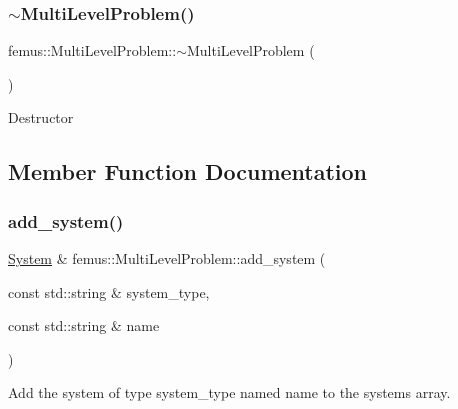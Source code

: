 \subsubsection{\texorpdfstring{$\sim$\+Multi\+Level\+Problem()}{~MultiLevelProblem()}}
{\footnotesize\ttfamily femus\+::\+Multi\+Level\+Problem\+::$\sim$\+Multi\+Level\+Problem (\begin{DoxyParamCaption}{ }\end{DoxyParamCaption})}

Destructor 

\subsection{Member Function Documentation}
\mbox{\label{classfemus_1_1_multi_level_problem_ad54bc6b7254d2331491ac48b58a2d9e3}} 
\subsubsection{\texorpdfstring{add\+\_\+system()}{add\_system()}\hspace{0.1cm}{\footnotesize\ttfamily [1/2]}}
{\footnotesize\ttfamily \mbox{\hyperlink{classfemus_1_1_system}{System}} \& femus\+::\+Multi\+Level\+Problem\+::add\+\_\+system (\begin{DoxyParamCaption}\item[{const std\+::string \&}]{system\+\_\+type,  }\item[{const std\+::string \&}]{name }\end{DoxyParamCaption})\hspace{0.3cm}{\ttfamily [virtual]}}

Add the system of type {\ttfamily system\+\_\+type} named {\ttfamily name} to the systems array. \mbox{\label{classfemus_1_1_multi_level_problem_a1bad05c602350e01f8dbc865d0af3962}} 
